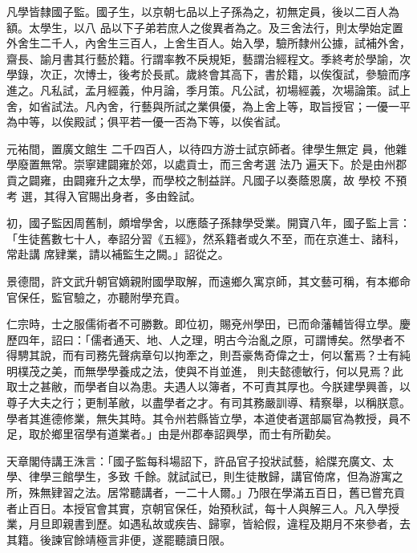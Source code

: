 
\begin{pinyinscope}

 凡學皆隸國子監。國子生，以京朝七品以上子孫為之，初無定員，後以二百人為額。太學生，以八
 品以下子弟若庶人之俊異者為之。及三舍法行，則太學始定置外舍生二千人，內舍生三百人，上舍生百人。始入學，驗所隸州公據，試補外舍，齋長、諭月書其行藝於籍。行謂率教不戾規矩，藝謂治經程文。季終考於學諭，次學錄，次正，次博士，後考於長貳。歲終會其高下，書於籍，以俟復試，參驗而序進之。凡私試，孟月經義，仲月論，季月策。凡公試，初場經義，次場論策。試上舍，如省試法。凡內舍，行藝與所試之業俱優，為上舍上等，取旨授官；一優一平為中等，以俟殿試；俱平若一優一否為下等，以俟省試。



 元祐間，置廣文館生
 二千四百人，以待四方游士試京師者。律學生無定
 員，他雜學廢置無常。崇寧建闢雍於郊，以處貢士，而三舍考選
 法乃
 遍天下。於是由州郡貢之闢雍，由闢雍升之太學，而學校之制益詳。凡國子以奏蔭恩廣，故
 學校
 不預考
 選，其得入官賜出身者，多由銓試。



 初，國子監因周舊制，頗增學舍，以應蔭子孫隸學受業。開寶八年，國子監上言：「生徒舊數七十人，奉詔分習《五經》，然系籍者或久不至，而在京進士、諸科，常赴講
 席肄業，請以補監生之闕。」詔從之。



 景德間，許文武升朝官嫡親附國學取解，而遠鄉久寓京師，其文藝可稱，有本鄉命官保任，監官驗之，亦聽附學充貢。



 仁宗時，士之服儒術者不可勝數。即位初，賜兗州學田，已而命藩輔皆得立學。慶歷四年，詔曰：「儒者通天、地、人之理，明古今治亂之原，可謂博矣。然學者不得騁其說，而有司務先聲病章句以拘牽之，則吾豪雋奇偉之士，何以奮焉？士有純明樸茂之美，而無學學養成之法，使與不肖並進，
 則夫懿德敏行，何以見焉？此取士之甚敝，而學者自以為患。夫遇人以簿者，不可責其厚也。今朕建學興善，以尊子大夫之行；更制革敝，以盡學者之才。有司其務嚴訓導、精察舉，以稱朕意。學者其進德修業，無失其時。其令州若縣皆立學，本道使者選部屬官為教授，員不足，取於鄉里宿學有道業者。」由是州郡奉詔興學，而士有所勸矣。



 天章閣侍講王洙言：「國子監每科場詔下，許品官子投狀試藝，給牒充廣文、太學、律學三館學生，多致
 千餘。就試試已，則生徒散歸，講官倚席，但為游寓之所，殊無肄習之法。居常聽講者，一二十人爾。」乃限在學滿五百日，舊已嘗充貢者止百日。本授官會其實，京朝官保任，始預秋試，每十人與解三人。凡入學授業，月旦即親書到歷。如遇私故或疾告、歸寧，皆給假，違程及期月不來參者，去其籍。後諫官餘靖極言非便，遂罷聽讀日限。




\end{pinyinscope}
